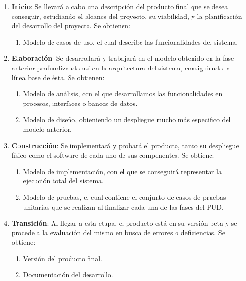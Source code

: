 \begin{enumerate}
    \item \textbf{Inicio}: Se llevará a cabo una descripción del producto final que se desea conseguir, estudiando el alcance del proyecto, su viabilidad, y la planificación del desarrollo del proyecto. Se obtienen:
    \begin{enumerate}
        \item Modelo de casos de uso, el cual describe las funcionalidades del sistema.
    \end{enumerate}
    \item \textbf{Elaboración}: Se desarrollará y trabajará en el modelo obtenido en la fase anterior profundizando así en la arquitectura del sistema, consiguiendo la línea base de ésta. Se obtienen:
    \begin{enumerate}
        \item Modelo de análisis, con el que desarrollamos las funcionalidades en procesos, interfaces o bancos de datos.
        \item Modelo de diseño, obteniendo un despliegue mucho más especifico del modelo anterior.
    \end{enumerate}
    \item \textbf{Construcción}: Se implementará y probará el producto, tanto su despliegue físico como el software de cada uno de sus componentes. Se obtiene:
    \begin{enumerate}
        \item Modelo de implementación, con el que se conseguirá representar la ejecución total del sistema.
        \item Modelo de pruebas, el cual contiene el conjunto de casos de pruebas unitarias que se realizan al finalizar cada una de las fases del PUD.
    \end{enumerate}
    \item \textbf{Transición}: Al llegar a esta etapa, el producto está en su versión beta y se procede a la evaluación del mismo en busca de errores o deficiencias. Se obtiene:
    \begin{enumerate}
        \item Versión del producto final.
        \item Documentación del desarrollo.
    \end{enumerate}
\end{enumerate}